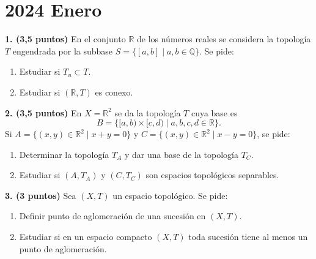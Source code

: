 \clearpage
\chapter*{2024 Enero}

\begin{enunciado}
    \hypertarget{2024 A 1}{}
    \textbf{1. (3,5 puntos)} En el conjunto \(\mathbb{R}\) de los números reales se considera la topología \(T\) engendrada por la subbase \(S = \{[a,b] \mid a,b \in \mathbb{Q}\}\). Se pide:
    \begin{enumerate}[label=\alph*)]
        \item Estudiar si \(T_u \subset T\).
        \item Estudiar si \((\mathbb{R},T)\) es conexo.
    \end{enumerate}
\end{enunciado}

\begin{enunciado}
    \hypertarget{2024 A 2}{}
    \textbf{2. (3,5 puntos)} En \(X = \mathbb{R}^2\) se da la topología \(T\) cuya base es
    \[
        B = \{[a,b) \times [c,d) \mid a,b,c,d \in \mathbb{R}\}.
    \]
    Si \(A = \{(x,y) \in \mathbb{R}^2 \mid x+y=0\}\) y \(C = \{(x,y) \in \mathbb{R}^2 \mid x-y=0\}\), se pide:
    \begin{enumerate}[label=\alph*)]
        \item Determinar la topología \(T_A\) y dar una base de la topología \(T_C\).
        \item Estudiar si \((A,T_A)\) y \((C,T_C)\) son espacios topológicos separables.
    \end{enumerate}
\end{enunciado}

\begin{enunciado}
    \hypertarget{2024 A 3}{}
    \textbf{3. (3 puntos)} Sea \((X,T)\) un espacio topológico. Se pide:
    \begin{enumerate}[label=\alph*)]
        \item Definir punto de aglomeración de una sucesión en \((X,T)\).
        \item Estudiar si en un espacio compacto \((X,T)\) toda sucesión tiene al menos un punto de aglomeración.
    \end{enumerate}
\end{enunciado}